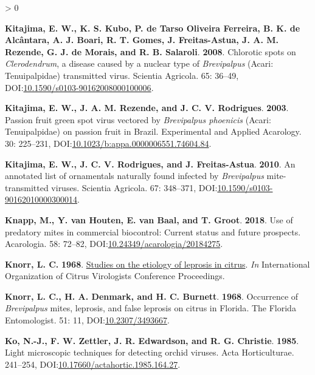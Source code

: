 \documentclass{ufdissertation}[overrideChapters] %
\newlength{\cslhangindent}
\newenvironment{CSLReferences}[2] %
 {%
  \setlength{\parindent}{0pt}
  \ifodd #1 \everypar{\setlength{\hangindent}{\cslhangindent}}\ignorespaces\fi
  \ifnum #2 > 0
  \setlength{\parskip}{#2\baselineskip}
  \fi
 }%
 {}
\begin{document}
{\begin{CSLReferences}{1}{1}
\leavevmode{}%
\textbf{Kitajima, E. W., K. S. Kubo, P. de Tarso Oliveira Ferreira, B. K. de Alcântara, A. J. Boari, R. T. Gomes, J. Freitas-Astua, J. A. M. Rezende, G. J. de Morais, and R. B. Salaroli}. \textbf{2008}. Chlorotic spots on {\emph{Clerodendrum}}, a disease caused by a nuclear type of {\emph{Brevipalpus}} ({Acari}: {Tenuipalpidae}) transmitted virus. Scientia Agricola. 65: 36--49, DOI:\href{https://doi.org/10.1590/s0103-90162008000100006}{10.1590/s0103-90162008000100006}.

\leavevmode{}%
\textbf{Kitajima, E. W., J. A. M. Rezende, and J. C. V. Rodrigues}. \textbf{2003}. {Passion fruit green spot virus} vectored by {\emph{Brevipalpus phoenicis}} ({Acari}: {Tenuipalpidae}) on passion fruit in {Brazil}. Experimental and Applied Acarology. 30: 225--231, DOI:\href{https://doi.org/10.1023/b:appa.0000006551.74604.84}{10.1023/b:appa.0000006551.74604.84}.

\leavevmode{}%
\textbf{Kitajima, E. W., J. C. V. Rodrigues, and J. Freitas-Astua}. \textbf{2010}. An annotated list of ornamentals naturally found infected by {\emph{Brevipalpus}} mite-transmitted viruses. Scientia Agricola. 67: 348--371, DOI:\href{https://doi.org/10.1590/s0103-90162010000300014}{10.1590/s0103-90162010000300014}.

\leavevmode{}%
\textbf{Knapp, M., Y. van Houten, E. van Baal, and T. Groot}. \textbf{2018}. Use of predatory mites in commercial biocontrol: Current status and future prospects. Acarologia. 58: 72--82, DOI:\href{https://doi.org/10.24349/acarologia/20184275}{10.24349/acarologia/20184275}.

\leavevmode{}%
\textbf{Knorr, L. C.} \textbf{1968}. \href{https://doi.org/10.5070/C526w4x67c}{Studies on the etiology of leprosis in citrus}. \emph{In} International Organization of Citrus Virologists Conference Proceedings.

\leavevmode{}%
\textbf{Knorr, L. C., H. A. Denmark, and H. C. Burnett}. \textbf{1968}. Occurrence of {\emph{Brevipalpus}} mites, leprosis, and false leprosis on citrus in {Florida}. The Florida Entomologist. 51: 11, DOI:\href{https://doi.org/10.2307/3493667}{10.2307/3493667}.

\leavevmode{}%
\textbf{Ko, N.-J., F. W. Zettler, J. R. Edwardson, and R. G. Christie}. \textbf{1985}. Light microscopic techniques for detecting orchid viruses. Acta Horticulturae. 241--254, DOI:\href{https://doi.org/10.17660/actahortic.1985.164.27}{10.17660/actahortic.1985.164.27}.


\end{CSLReferences}}
\end{document}
